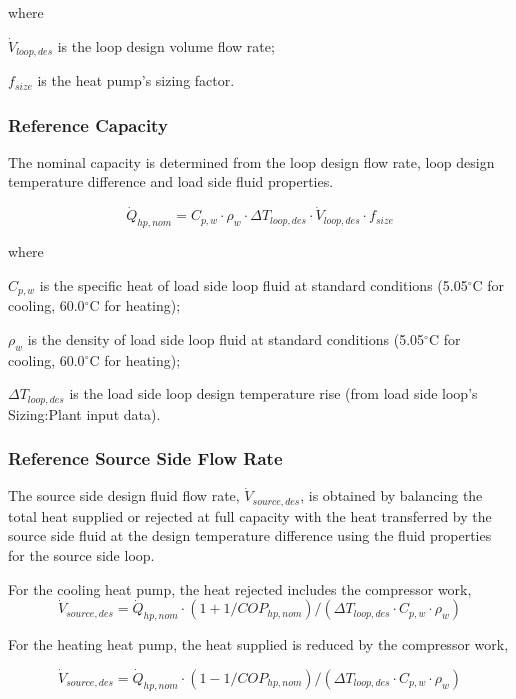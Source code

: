 where

\( \dot V_{loop,des} \) is the loop design volume flow rate;

\( f_{size} \) is the heat pump's sizing factor.

\subsubsection{Reference Capacity}\label{wwhp-ref-capacity}

The nominal capacity is determined from the loop design flow rate, loop design temperature difference and load side fluid properties.

\begin{equation}
\dot Q_{hp,nom} = C_{p,w} \cdot \rho_w \cdot \Delta T_{loop,des} \cdot \dot V_{loop,des} \cdot f_{size}
\end{equation}

where

\( C_{p,w} \) is the specific heat of load side loop fluid at standard conditions (5.05\(^{\circ}\)C for cooling, 60.0\(^{\circ}\)C for heating);

\( \rho_w \) is the density of load side loop fluid at standard conditions (5.05\(^{\circ}\)C for cooling, 60.0\(^{\circ}\)C for heating);

\( \Delta T_{loop,des} \) is the load side loop design temperature rise (from load side loop's Sizing:Plant input data).

\subsubsection{Reference Source Side Flow Rate}\label{WWHP-ref-source-side-flow-rate}

The source side design fluid flow rate, \( \dot V_{source,des} \), is obtained by balancing the total heat supplied or rejected at full capacity with the heat transferred by the source side fluid at the design temperature difference using the fluid properties for the source side loop.

For the cooling heat pump, the heat rejected includes the compressor work,
\begin{equation}
\dot V_{source,des} = \dot Q_{hp,nom} \cdot (1 + 1/COP_{hp,nom})/(\Delta T_{loop,des} \cdot C_{p,w} \cdot \rho_w)
\end{equation}

For the heating heat pump, the heat supplied is reduced by the compressor work,

\begin{equation}
\dot V_{source,des} = \dot Q_{hp,nom} \cdot (1 - 1/COP_{hp,nom})/(\Delta T_{loop,des} \cdot C_{p,w} \cdot \rho_w)
\end{equation}

